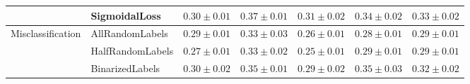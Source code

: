 \begin{table}[t]
{\begin{tabular}{l|l|llll|l}
                                                                                      & SigmoidalLoss                                                       & \multicolumn{1}{l}{$0.30\pm0.01$}                                                                       & \multicolumn{1}{l}{$0.37\pm0.01$}                                                           & \multicolumn{1}{l}{$0.31\pm0.02$}                                                                              & \multicolumn{1}{l|}{$0.34\pm0.02$}                                                                      & $\mathbf{0.33\pm0.02}$                                                                                                 \\ \hline
\multirow{3}{*}{Misclassification}                                                    & AllRandomLabels                                                     & $0.29\pm0.01$                                                                                           & $0.33\pm0.03$                                                                               & $0.26\pm0.01$                                                                                                  & $0.28\pm0.01$                                                                                           & $0.29\pm0.01$                                                                                                          \\
                                                                                      & HalfRandomLabels                                                    & $0.27\pm0.01$                                                                                           & $0.33\pm0.02$                                                                               & $0.25\pm0.01$                                                                                                  & $0.29\pm0.01$                                                                                           & $0.29\pm0.01$                                                                                                          \\
                                                                                      & BinarizedLabels                                                     & $0.30\pm0.02$                                                                                           & $0.35\pm0.01$                                                                               & $0.29\pm0.02$                                                                                                  & $0.35\pm0.03$                                                                                           & $\mathbf{0.32\pm0.02}$                                                                                                 \\ \hline

\end{tabular}}
\end{table}
